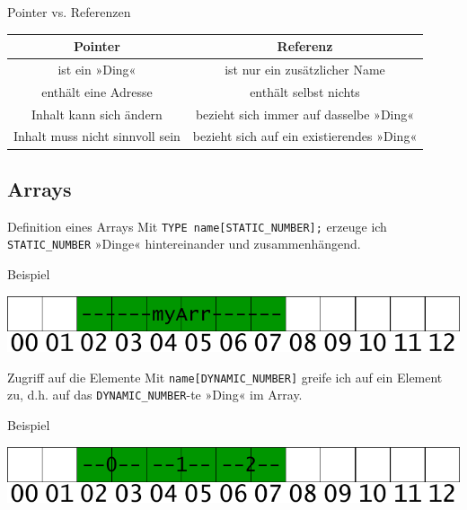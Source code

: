 \begin{frame}[fragile]{Pointer vs. Referenzen}
	\footnotesize
	\begin{tabular}{c|c}
		Pointer & Referenz \\ \hline
		ist ein »Ding« & ist nur ein zusätzlicher Name \\
		enthält eine Adresse & enthält selbst nichts \\
		Inhalt kann sich ändern & bezieht sich immer auf dasselbe »Ding« \\
		Inhalt muss nicht sinnvoll sein & bezieht sich auf ein existierendes »Ding« \\
	\end{tabular}
	
	\pause
	
	{\footnotesize
	\begin{block}{}
		
	\end{block}
	}
\end{frame}


\subsection{Arrays}

\begin{frame}[fragile]{Definition eines Arrays}
	Mit \verb|TYPE name[STATIC_NUMBER];| erzeuge ich \verb|STATIC_NUMBER| »Dinge« hintereinander und zusammenhängend.
	
	\pause
	\vspace{1em}
	
	\begin{block}{Beispiel}
		{\footnotesize
			
		}
	
		\vspace{1em}
		\includegraphics[width=0.75\linewidth]{images/array_small}
	\end{block}
\end{frame}

\begin{frame}[fragile]{Zugriff auf die Elemente}
	Mit \verb|name[DYNAMIC_NUMBER]| greife ich auf ein Element zu, d.h. auf das \verb|DYNAMIC_NUMBER|-te »Ding« im Array.
	
	\vspace{1em}
	\pause
	
	\begin{block}{Beispiel}
		{\footnotesize
			
		}
	
		\vspace{1em}
		\includegraphics[width=0.75\linewidth]{images/array_elems_small}
	\end{block}
\end{frame}

